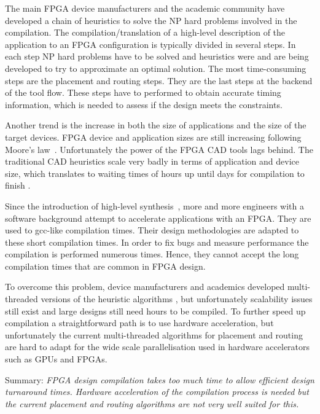 \documentclass[a4paper,oneside,12pt]{article}
\begin{document}
The main FPGA device manufacturers and the academic community have developed a chain of heuristics to solve the NP hard problems involved in the compilation.
The compilation/translation of a high-level description of the application to an FPGA configuration is typically divided in several steps. In each step NP hard problems have to be solved and heuristics were and are being developed to try to approximate an optimal solution. The most time-consuming steps are the placement and routing steps. They are the last steps at the backend of the tool flow. These steps have to performed to obtain accurate timing information, which is needed to assess if the design meets the constraints. 
 
Another trend is the increase in both the size of applications and the size of the target devices. FPGA device and application sizes are still increasing following Moore's law~\cite{shannon2015technology}. Unfortunately the power of the FPGA CAD tools lags behind. The traditional CAD heuristics scale very badly in terms of application and device size, which translates to waiting times of hours up until days for compilation to finish \cite{murray2015timing}. 

Since the introduction of high-level synthesis~\cite{autoesl}, more and more engineers with a software background attempt to accelerate applications with an FPGA. They are used to gcc-like compilation times. Their design methodologies are adapted to these short compilation times. In order to fix bugs and measure performance the compilation is performed numerous times. Hence, they cannot accept the long compilation times that are common in FPGA design.

To overcome this problem, device manufacturers and academics developed multi-threaded versions of the heuristic algorithms \cite{ludwin2011,gort2012,betz2013method,jain2014multi}, but unfortunately scalability issues still exist and large designs still need hours to be compiled. To further speed up compilation a straightforward path is to use hardware acceleration, but unfortunately the current multi-threaded algorithms for placement and routing are hard to adapt for the wide scale parallelisation used in hardware accelerators such as GPUs and FPGAs.

Summary: \emph{FPGA design compilation takes too much time to allow efficient design turnaround times. Hardware acceleration of the compilation process is needed but the current placement and routing algorithms are not very well suited for this.
} 
\end{document}
